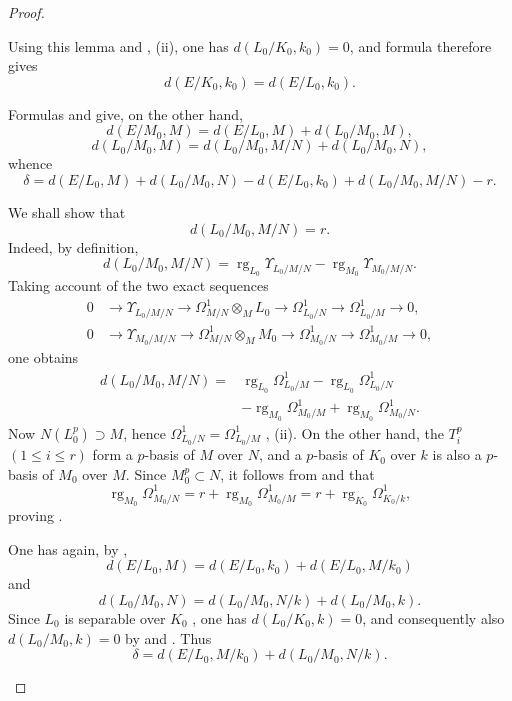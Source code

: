 \begin{proof}
\begin{enumerate}
  Using this lemma and , (ii), one has $d(L_0/K_0,k_0)=0$, and formula  therefore gives
  \[
    d(E/K_0,k_0)=d(E/L_0,k_0).
  \]

  Formulas  and  give, on the other hand,
  \[
    d(E/M_0,M)=d(E/L_0,M)+d(L_0/M_0,M),
  \]
  \[
    d(L_0/M_0,M)=d(L_0/M_0,M/N)+d(L_0/M_0,N),
  \]
  whence
  \[
    \delta=d(E/L_0,M)+d(L_0/M_0,N)-d(E/L_0,k_0)+d(L_0/M_0,M/N)-r.
  \]

  We shall show that
  \begin{equation}
  \tag{21.9.6.5}
  \label{0.21.9.6.5}
    d(L_0/M_0,M/N)=r.
  \end{equation}
  Indeed, by definition,
  \[
    d(L_0/M_0,M/N)=\operatorname{rg}_{L_0}\Upsilon_{L_0/M/N}-\operatorname{rg}_{M_0}\Upsilon_{M_0/M/N}.
  \]
  Taking account of the two exact sequences
  \[
  \begin{aligned}
    0&\longrightarrow\Upsilon_{L_0/M/N}\longrightarrow\Omega^1_{M/N}\otimes_ML_0
      \longrightarrow\Omega^1_{L_0/N}\longrightarrow\Omega^1_{L_0/M}\longrightarrow0,\\
    0&\longrightarrow\Upsilon_{M_0/M/N}\longrightarrow\Omega^1_{M/N}\otimes_MM_0
      \longrightarrow\Omega^1_{M_0/N}\longrightarrow\Omega^1_{M_0/M}\longrightarrow0,
  \end{aligned}
  \]
  one obtains
  \[
  \begin{split}
    d(L_0/M_0,M/N)={}&\operatorname{rg}_{L_0}\Omega^1_{L_0/M}
      -\operatorname{rg}_{L_0}\Omega^1_{L_0/N}\\
      &-\operatorname{rg}_{M_0}\Omega^1_{M_0/M}
      +\operatorname{rg}_{M_0}\Omega^1_{M_0/N}.
  \end{split}
  \]
  Now $N(L_0^p)\supset M$, hence $\Omega^1_{L_0/N}=\Omega^1_{L_0/M}$ , (ii).
  On the other hand, the $T_i^p$ $(1\leqslant i\leqslant r)$ form a $p$-basis of $M$ over $N$, and a $p$-basis of $K_0$ over $k$ is also a $p$-basis of $M_0$ over $M$.
  Since $M_0^p\subset N$, it follows from  and  that
  \[
    \operatorname{rg}_{M_0}\Omega^1_{M_0/N}
      =r+\operatorname{rg}_{M_0}\Omega^1_{M_0/M}
      =r+\operatorname{rg}_{K_0}\Omega^1_{K_0/k},
  \]
  proving .

  One has again, by ,
  \[
    d(E/L_0,M)=d(E/L_0,k_0)+d(E/L_0,M/k_0)
  \]
  and
  \[
    d(L_0/M_0,N)=d(L_0/M_0,N/k)+d(L_0/M_0,k).
  \]
  Since $L_0$ is separable over $K_0$ , one has $d(L_0/K_0,k)=0$, and consequently also $d(L_0/M_0,k)=0$ by  and .
  Thus
  \[
    \delta=d(E/L_0,M/k_0)+d(L_0/M_0,N/k).
  \]


\end{enumerate}
\end{proof}
